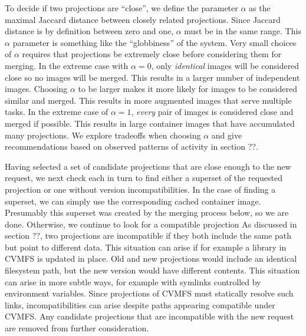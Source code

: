 \documentclass[conference]{IEEEtran}
\begin{document}
To decide if two projections are ``close'',
we define the parameter $\alpha$ as the maximal Jaccard distance between closely related projections.
Since Jaccard distance is by definition between zero and one,
$\alpha$ must be in the same range.
This $\alpha$ parameter is something like the ``globbiness'' of the system.
Very small choices of $\alpha$ requires that projections be extremely close before considering them for merging.
In the extreme case with $\alpha = 0$,
only \emph{identical} images will be considered close so no images will be merged.
This results in a larger number of independent images.
Choosing $\alpha$ to be larger makes it more likely for images to be considered similar and merged.
This results in more augmented images that serve multiple tasks.
In the extreme case of $\alpha = 1$,
\emph{every} pair of images is considered close and merged if possible.
This results in large container images that have accumulated many projections.
We explore tradeoffs when choosing $\alpha$ and give recommendations based on observed patterns of activity in section ??.

Having selected a set of candidate projections that are close enough to the new request,
we next check each in turn to find either a superset of the requested projection or one without version incompatibilities.
In the case of finding a superset,
we can simply use the corresponding cached container image.
Presumably this superset was created by the merging process below,
so we are done.
Otherwise, we continue to look for a compatible projection
As discussed in section ??,
two projections are incompatible if they both include the same path but point to different data.
This situation can arise if for example a library in CVMFS is updated in place.
Old and new projections would include an identical filesystem path,
but the new version would have different contents.
This situation can arise in more subtle ways,
for example with symlinks controlled by environment variables.
Since projections of CVMFS must statically resolve such links,
incompatibilities can arise despite paths appearing compatible under CVMFS.
Any candidate projections that are incompatible with the new request are removed from further consideration.
\end{document}
